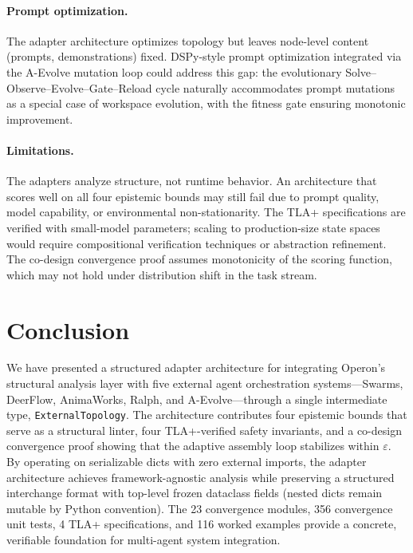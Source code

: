 \documentclass[11pt]{article}
\begin{document}
\paragraph{Prompt optimization.}
The adapter architecture optimizes topology but leaves node-level content
(prompts, demonstrations) fixed.  DSPy-style prompt optimization
integrated via the A-Evolve mutation loop could address this gap: the
evolutionary Solve--Observe--Evolve--Gate--Reload cycle naturally
accommodates prompt mutations as a special case of workspace evolution,
with the fitness gate ensuring monotonic improvement.

\paragraph{Limitations.}
The adapters analyze structure, not runtime behavior.  An architecture that
scores well on all four epistemic bounds may still fail due to prompt
quality, model capability, or environmental non-stationarity.  The TLA+
specifications are verified with small-model parameters; scaling to
production-size state spaces would require compositional verification
techniques or abstraction refinement.  The co-design convergence proof
assumes monotonicity of the scoring function, which may not hold under
distribution shift in the task stream.

\section{Conclusion}\label{sec:conclusion}

We have presented a structured adapter architecture for integrating Operon's
structural analysis layer with five external agent orchestration
systems---Swarms, DeerFlow, AnimaWorks, Ralph, and A-Evolve---through a
single intermediate type, \texttt{ExternalTopology}.  The architecture
contributes four epistemic bounds that serve as a structural linter, four
TLA+-verified safety invariants, and a co-design convergence proof showing
that the adaptive assembly loop stabilizes within $\varepsilon$.  By
operating on serializable dicts with zero external imports, the adapter
architecture achieves framework-agnostic analysis while preserving a
structured interchange format with top-level frozen dataclass fields
(nested dicts remain mutable by Python convention).  The 23 convergence modules, 356 convergence unit tests, 4 TLA+
specifications, and 116 worked examples provide a concrete, verifiable
foundation for multi-agent system integration.
\end{document}
